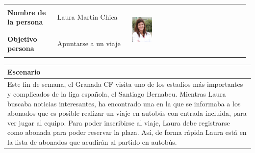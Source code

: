 \documentclass[11pt]{article}
\begin{document}
\begin{table}[H]
  \centering
  \begin{tabular}{p{0.2\linewidth}|p{0.3\linewidth}p{0.475\linewidth}}
    \toprule
    \textbf{Nombre de la persona} & Laura Martín Chica &\multirow{2}{*}{\begin{minipage}{1.\textwidth}\includegraphics[width=0.18\textwidth, height=26mm]{Ana}\end{minipage}}\\
    \textbf{Objetivo persona} & Apuntarse a un viaje & \\
    \bottomrule
  \end{tabular}

\begin{tabular}{p{1.028\linewidth}}
  \textbf{Escenario}\\
  \midrule
  Este fin de semana, el Granada CF visita uno de los estadios más importantes y complicados de la liga española, el Santiago Bernabeu. Mientras Laura buscaba noticias interesantes, ha encontrado una en la que se informaba a los abonados que es posible realizar un viaje en autobús con entrada incluida, para ver jugar al equipo. Para poder inscribirse al viaje, Laura debe registrarse como abonada para poder reservar la plaza.
Así, de forma rápida Laura está en la lista de abonados que acudirán al partido en autobús. 
\end{tabular}
\end{table}
\end{document}
